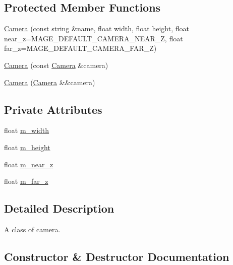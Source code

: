 \subsection*{Protected Member Functions}
\begin{DoxyCompactItemize}
\item 
\hyperlink{classmage_1_1_camera_a6e7f3eaa4d29f780d9389b99c66c21ab}{Camera} (const string \&name, float width, float height, float near\+\_\+z=M\+A\+G\+E\+\_\+\+D\+E\+F\+A\+U\+L\+T\+\_\+\+C\+A\+M\+E\+R\+A\+\_\+\+N\+E\+A\+R\+\_\+Z, float far\+\_\+z=M\+A\+G\+E\+\_\+\+D\+E\+F\+A\+U\+L\+T\+\_\+\+C\+A\+M\+E\+R\+A\+\_\+\+F\+A\+R\+\_\+Z)
\item 
\hyperlink{classmage_1_1_camera_a28d9280bd7067ec4d28392558cc2b767}{Camera} (const \hyperlink{classmage_1_1_camera}{Camera} \&camera)
\item 
\hyperlink{classmage_1_1_camera_a4dc6f31c108b28abe9580ef6d7a06713}{Camera} (\hyperlink{classmage_1_1_camera}{Camera} \&\&camera)
\end{DoxyCompactItemize}
\subsection*{Private Attributes}
\begin{DoxyCompactItemize}
\item 
float \hyperlink{classmage_1_1_camera_acc8f371214af02fdac9a1ff04508c4ca}{m\+\_\+width}
\item 
float \hyperlink{classmage_1_1_camera_a48485eca596702f0e5985ec8b7db35a5}{m\+\_\+height}
\item 
float \hyperlink{classmage_1_1_camera_a685f8700a29d1f1eff2bec353c3ec970}{m\+\_\+near\+\_\+z}
\item 
float \hyperlink{classmage_1_1_camera_abe2eeca725ce3da238256007454b241f}{m\+\_\+far\+\_\+z}
\end{DoxyCompactItemize}


\subsection{Detailed Description}
A class of camera. 

\subsection{Constructor \& Destructor Documentation}
\hypertarget{classmage_1_1_camera_a181f7fdf168c0d66022edfecb697dd7d}{}\label{classmage_1_1_camera_a181f7fdf168c0d66022edfecb697dd7d} 
